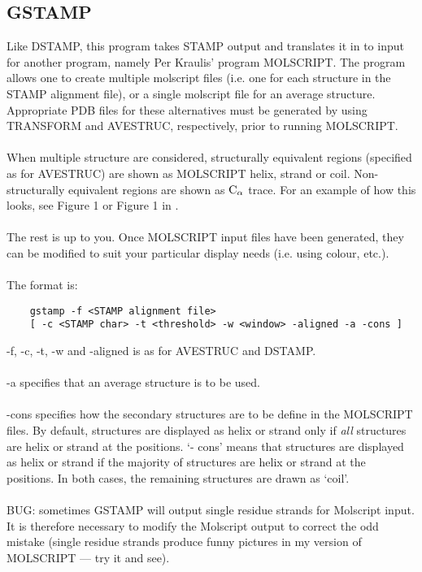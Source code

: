     \subsection{GSTAMP}

    Like DSTAMP, this program takes STAMP output and translates it in to input
    for another program, namely Per Kraulis' program MOLSCRIPT.  The program
    allows one to create multiple molscript files (i.e. one for each structure
    in the STAMP alignment file), or a single molscript file for an average
    structure.  Appropriate PDB files for these alternatives must be
    generated by using TRANSFORM and AVESTRUC, respectively, prior to running
    MOLSCRIPT.\\
    \\
    When multiple structure are considered, structurally equivalent regions
    (specified as for AVESTRUC) are shown as MOLSCRIPT helix, strand or coil.
    Non-structurally equivalent regions are shown as ${\rm C}_{\alpha}$ trace.  For an
    example of how this looks, see Figure 1 \cite{rb94} or Figure 1 in 
    \cite{russell94}.\\
    \\
    The rest is up to you.  Once MOLSCRIPT input files have been generated, they
    can be modified to suit your particular display needs (i.e. using colour, 
    etc.).\\
    \\
    The format is:\\

    \begin{scriptsize}\begin{verbatim}
    gstamp -f <STAMP alignment file> 
    [ -c <STAMP char> -t <threshold> -w <window> -aligned -a -cons ]
    \end{verbatim} \end{scriptsize}

    -f, -c, -t, -w and -aligned is as for AVESTRUC and DSTAMP.\\
    \\
    -a specifies that an average structure is to be used.\\
    \\
    -cons specifies how the secondary structures are to be define in the 
    MOLSCRIPT files.  By default, structures are displayed as helix or strand
    only if {\em all} structures are helix or strand at the positions.  `- cons'
    means that structures are displayed as helix or strand if the majority  
    of structures are helix or strand at the positions.  In both cases, the
    remaining structures are drawn as `coil'.\\
    \\
    BUG: sometimes GSTAMP will output single residue strands for Molscript 
    input.  It is therefore necessary to modify the Molscript output to 
    correct the odd mistake (single residue strands produce funny pictures
    in my version of MOLSCRIPT --- try it and see).


